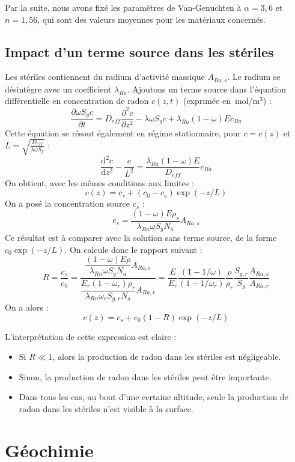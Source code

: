 \documentclass{article}
\begin{document}
Par la suite, nous avons fixé les paramètres de Van-Genuchten à $\alpha = 3,6$ et $n=1,56$, qui sont des valeurs moyennes pour les matériaux concernés.

\newpage
\subsection{Impact d'un terme source dans les stériles}
\label{annexe:termesource}

Les stériles contiennent du radium d’activité massique $A_{Ra,s}$. Le radium se désintègre avec un coefficient $\lambda_{Ra}$. Ajoutons un terme source dans l’équation différentielle en concentration de radon $c(z,t)$ (exprimée en~mol/m$^3$) :
$$
\frac{\partial \omega S_g c}{\partial t} = D_{eff}  \frac{\partial^2 c}{\partial z^2}-\lambda \omega S_g c + \lambda_{Ra}(1-\omega)E c_{Ra}
$$
Cette équation se résout également en régime stationnaire, pour $c=c(z)$ et $L=\sqrt{\frac{D_{eff}}{\lambda \omega S_g }}$ :
$$
\frac{\text{d}^2 c}{\text{d}z^2} - \frac{c}{L^2}= \frac{\lambda_{Ra}(1-\omega)E}{D_{eff}} c_{Ra}
$$
On obtient, avec les mêmes conditions aux limites :
$$
c(z)= c_s + (c_0 - c_s) \exp(-z/L)
$$
On a posé la concentration source $c_s$ :
$$
c_s = \frac{(1-\omega)E\rho_s}{\lambda_{Rn}\omega S_g N_a} A_{Ra,s} 
$$
Ce résultat est à comparer avec la solution sans terme source, de la forme $c_0 \exp(-z/L)$. On calcule donc le rapport suivant :
$$
R=\dfrac{c_s}{c_0}= \dfrac{\dfrac{(1-\omega)E\rho}{\lambda_{Rn}\omega S_g N_a} A_{Ra,s}}{\dfrac{ E_r (1-\omega_r) \rho_r }{\lambda_{Rn} \omega_r S_{g,r} N_a} A_{Ra,r}} = \frac{E}{E_r} \frac{(1-1/\omega)}{(1-1/\omega_r)} \frac{\rho}{\rho_r} \frac{S_{g,r}}{S_g} \frac{A_{Ra,s}}{A_{Ra,r}}
$$
On a alors :
$$
c(z)=c_s + c_0(1-R) \exp(-z/L)
$$

L'interprétation de cette expression est claire :
\begin{itemize}
  \item Si $R\ll 1$, alors la production de radon dans les stériles est négligeable.
  \item Sinon, la production de radon dans les stériles peut être importante.
  \item Dans tous les cas, au bout d'une certaine altitude, seule la production de radon dans les stériles n'est visible à la surface.
\end{itemize}





\section{Géochimie}
\end{document}
